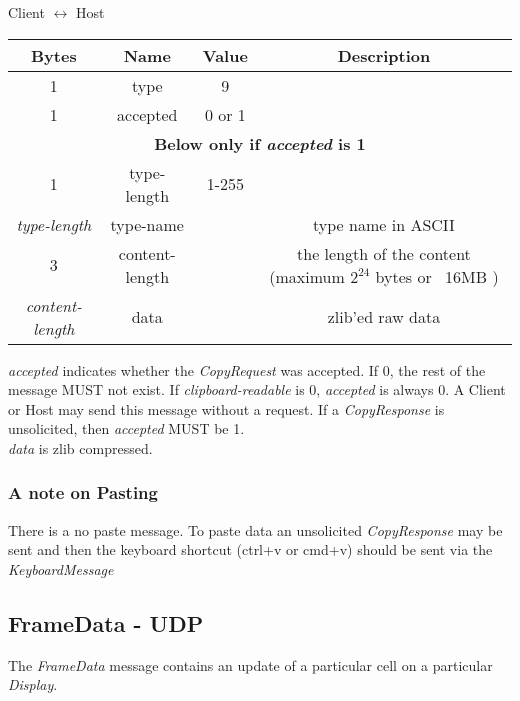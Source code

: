 \begin{center}
    Client $\leftrightarrow$ Host\\
    \begin{tabular}{|c|c|c|c|}
        \hline
        \textbf{Bytes}        & \textbf{Name} & \textbf{Value} & \textbf{Description} \\
        \hline
        1                     & type          & 9              &                      \\
        \hline
        1                     & accepted      & 0 or 1         &                      \\
        \hline
        \multicolumn{4}{|c|}{\textbf{Below only if \emph{accepted} is 1} } \\
        \hline
        1                     & type-length   & 1-255          &                      \\
        \hline
        \emph{type-length}    & type-name     &                & type name in ASCII   \\
        \hline
        3 & content-length & & the length of the content  (maximum $2^{24}$
        bytes or ~16MB ) \\
        \hline
        \emph{content-length} & data          &                & zlib'ed raw data     \\
        \hline
    \end{tabular}
\end{center}



\emph{accepted} indicates whether the \emph{CopyRequest} was accepted. If 0, the rest of the message MUST not exist.
If \emph{clipboard-readable} is 0, \emph{accepted} is always 0. A Client or Host may send this message without a
request.
If a \emph{CopyResponse} is unsolicited, then \emph{accepted} MUST be 1.\\

\emph{data} is zlib compressed.

\subsubsection{A note on Pasting}

There is a no paste message. To paste data an unsolicited \emph{CopyResponse} may be sent and then the keyboard
shortcut (ctrl+v or cmd+v) should be sent via the \emph{KeyboardMessage}

\subsection{FrameData - UDP}
The \emph{FrameData} message contains an update of a particular cell on a particular \emph{Display}.

